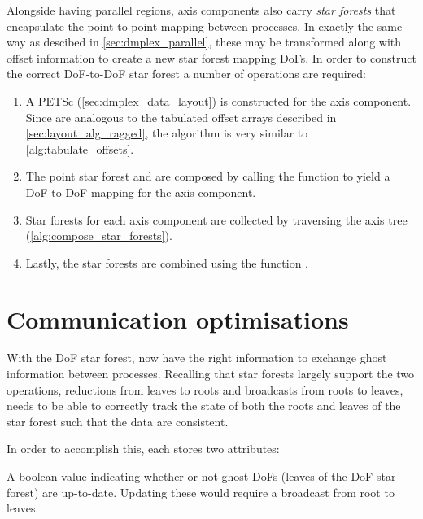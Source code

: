 \documentclass[thesis]{subfiles}
\begin{document}
Alongside having parallel regions, axis components also carry \textit{star forests} that encapsulate the point-to-point mapping between processes.
In exactly the same way as descibed in \cref{sec:dmplex_parallel}, these may be transformed along with offset information to create a new star forest mapping DoFs.
In order to construct the correct DoF-to-DoF star forest a number of operations are required:

\begin{enumerate}
  \item
    A PETSc  (\cref{sec:dmplex_data_layout}) is constructed for the axis component.
    Since  are analogous to the tabulated offset arrays described in \cref{sec:layout_alg_ragged}, the algorithm is very similar to \cref{alg:tabulate_offsets}.

  \item
    The point star forest and  are composed by calling the function  to yield a DoF-to-DoF mapping for the axis component.

  \item
    Star forests for each axis component are collected by traversing the axis tree (\cref{alg:compose_star_forests}).

  \item
    Lastly, the star forests are combined using the function .
\end{enumerate}

\section{Communication optimisations}
\label{sec:communication_optimisations}

With the DoF star forest,   now have the right information to exchange ghost information between processes.
Recalling that star forests largely support the two operations, reductions from leaves to roots and broadcasts from roots to leaves,  needs to be able to correctly track the state of both the roots and leaves of the star forest such that the data are consistent.

In order to accomplish this, each  stores two attributes:

\begin{paragraph}{}
  A boolean value indicating whether or not ghost DoFs (leaves of the DoF star forest) are up-to-date.
  Updating these would require a broadcast from root to leaves.
\end{paragraph}
\end{document}
